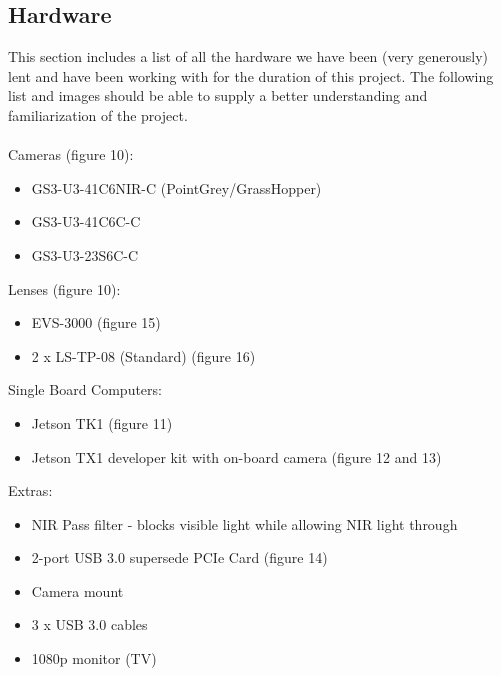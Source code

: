\subsection{Hardware}
   This section includes a list of all the hardware we have been (very generously) lent and have been working with for the duration of this project. The following list and images should be able to supply a better understanding and familiarization of the project.\\
	\\Cameras (figure 10):  
    		\begin{itemize}
		\item GS3-U3-41C6NIR-C (PointGrey/GrassHopper)
		\item GS3-U3-41C6C-C
		\item GS3-U3-23S6C-C\\
		\end{itemize}
	Lenses (figure 10): 
		\begin{itemize}
		\item EVS-3000 (figure 15)
		\item 2 x LS-TP-08 (Standard) (figure 16)\\
		\end{itemize}					
	Single Board Computers: 
		\begin{itemize}
		\item Jetson TK1 (figure 11) 
		\item Jetson TX1 developer kit with on-board camera (figure 12 and 13)\\
		\end{itemize}		
	Extras: 
		\begin{itemize}
		\item NIR Pass filter - blocks visible light while allowing NIR light through
		\item 2-port USB 3.0 supersede PCIe Card (figure 14)
		\item Camera mount
		\item 3 x USB 3.0 cables
		\item 1080p monitor (TV)\\
		\end{itemize}
		
